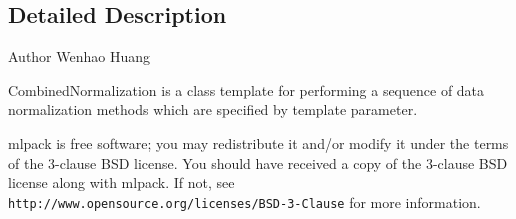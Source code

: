\subsection{Detailed Description}
\begin{DoxyAuthor}{Author}
Wenhao Huang
\end{DoxyAuthor}
Combined\+Normalization is a class template for performing a sequence of data normalization methods which are specified by template parameter.

mlpack is free software; you may redistribute it and/or modify it under the terms of the 3-\/clause B\+SD license. You should have received a copy of the 3-\/clause B\+SD license along with mlpack. If not, see {\tt http\+://www.\+opensource.\+org/licenses/\+B\+S\+D-\/3-\/\+Clause} for more information. 